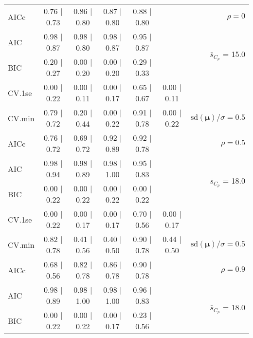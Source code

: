 \documentclass[12pt]{article}
\newcommand{\mr}[1]{\mathrm{#1}}
\newcommand{\bm}[1]{\mathbf{#1}}
\begin{document}
\begin{table}[p]
\begin{center}
\begin{tabular}{l*{5}{c}|r}
AICc & 0.76 $\mid$ 0.73 & 0.86 $\mid$ 0.80 & 0.87 $\mid$ 0.80 & 0.88 $\mid$ 0.80 & & $\rho=0$ \\
AIC & 0.98 $\mid$ 0.87 & 0.98 $\mid$ 0.80 & 0.98 $\mid$ 0.87 & 0.95 $\mid$ 0.87 & & \multirow{2}{*}{$\bar{s}_{C_p}$ = 15.0} \\
BIC & 0.20 $\mid$ 0.27 & 0.00 $\mid$ 0.20 & 0.00 $\mid$ 0.20 & 0.29 $\mid$ 0.33 & & \\
 \hline 
CV.1se & 0.00 $\mid$ 0.22 & 0.00 $\mid$ 0.11 & 0.00 $\mid$ 0.17 & 0.65 $\mid$ 0.67 & 0.00 $\mid$ 0.11 &\\
CV.min & 0.79 $\mid$ 0.72 & 0.20 $\mid$ 0.44 & 0.00 $\mid$ 0.22 & 0.91 $\mid$ 0.78 & 0.00 $\mid$ 0.22 &  $\mr{sd}(\bm{\mu})/\sigma=0.5$ \\
AICc & 0.76 $\mid$ 0.72 & 0.69 $\mid$ 0.72 & 0.92 $\mid$ 0.89 & 0.92 $\mid$ 0.78 & & $\rho=0.5$ \\
AIC & 0.98 $\mid$ 0.94 & 0.98 $\mid$ 0.89 & 0.98 $\mid$ 1.00 & 0.95 $\mid$ 0.83 & & \multirow{2}{*}{$\bar{s}_{C_p}$ = 18.0} \\
BIC & 0.00 $\mid$ 0.22 & 0.00 $\mid$ 0.22 & 0.00 $\mid$ 0.22 & 0.00 $\mid$ 0.22 & & \\
 \hline 
CV.1se & 0.00 $\mid$ 0.22 & 0.00 $\mid$ 0.17 & 0.00 $\mid$ 0.17 & 0.70 $\mid$ 0.56 & 0.00 $\mid$ 0.17 &\\
CV.min & 0.82 $\mid$ 0.78 & 0.41 $\mid$ 0.56 & 0.40 $\mid$ 0.50 & 0.90 $\mid$ 0.78 & 0.44 $\mid$ 0.50 &  $\mr{sd}(\bm{\mu})/\sigma=0.5$ \\
AICc & 0.68 $\mid$ 0.56 & 0.82 $\mid$ 0.78 & 0.86 $\mid$ 0.78 & 0.90 $\mid$ 0.78 & & $\rho=0.9$ \\
AIC & 0.98 $\mid$ 0.89 & 0.98 $\mid$ 1.00 & 0.98 $\mid$ 1.00 & 0.96 $\mid$ 0.83 & & \multirow{2}{*}{$\bar{s}_{C_p}$ = 18.0} \\
BIC & 0.00 $\mid$ 0.22 & 0.00 $\mid$ 0.22 & 0.00 $\mid$ 0.17 & 0.23 $\mid$ 0.56 & & \\
 \hline 
 \end{tabular}
\end{center}
\vspace{-1cm}
\end{table}
\end{document}
